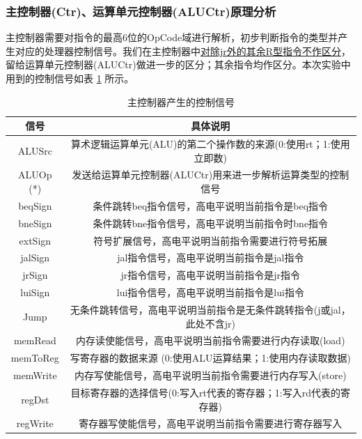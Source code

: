 \documentclass{cumcm}
\numberwithin{equation}{section}
\numberwithin{equation}{subsection}
\begin{document}
\subsubsection{主控制器(Ctr)、运算单元控制器(ALUCtr)原理分析}\label{section2.1.1}
主控制器需要对指令的最高6位的OpCode域进行解析，初步判断指令的类型并产生对应的处理器控制信号。我们在主控制器中\underline{对除jr外的其余R型指令不作区分}，留给运算单元控制器(ALUCtr)做进一步的区分；其余指令均作区分。本次实验中用到的控制信号如表 \ref{tab1} 所示。

\begin{table}[htbp]
    \centering
    \begin{tabular}{|c|c|}
         \hline
         信号 & 具体说明 \\ \hline
         ALUSrc & 算术逻辑运算单元(ALU)的第二个操作数的来源(0:使用rt；1:使用立即数)\\
         ALUOp (*) & 发送给运算单元控制器(ALUCtr)用来进一步解析运算类型的控制信号 \\
         beqSign & 条件跳转beq指令信号，高电平说明当前指令是beq指令 \\
         bneSign & 条件跳转bne指令信号，高电平说明当前指令时bne指令 \\
         extSign & 符号扩展信号，高电平说明当前指令需要进行符号拓展 \\
         jalSign & jal指令信号，高电平说明当前指令是jal指令 \\
         jrSign & jr指令信号，高电平说明当前指令是jr指令 \\
         luiSign & lui指令信号，高电平说明当前指令是lui指令 \\
         Jump & 无条件跳转信号，高电平说明当前指令是无条件跳转指令(j或jal，此处不含jr) \\
         memRead & 内存读使能信号，高电平说明当前指令需要进行内存读取(load) \\
         memToReg & 写寄存器的数据来源 (0:使用ALU运算结果；1:使用内存读取数据) \\
         memWrite & 内存写使能信号，高电平说明当前指令需要进行内存写入(store) \\
         regDst & 目标寄存器的选择信号(0:写入rt代表的寄存器；1:写入rd代表的寄存器)\\
         regWrite & 寄存器写使能信号，高电平说明当前指令需要进行寄存器写入 \\
         \hline
    \end{tabular}
    \caption{主控制器产生的控制信号}
    \label{tab1}
\end{table}
\end{document}
